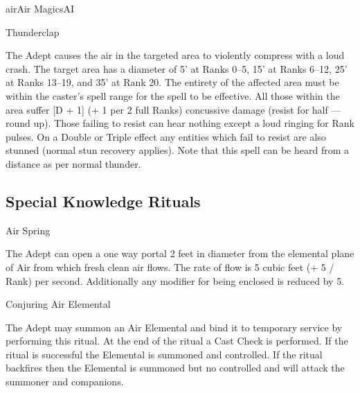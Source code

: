 \begin{college}[2.1]{air}{Air Magics}{AI}
\begin{spell}[S-19]{Thunderclap}
\begin{effects}
The Adept causes the air in the targeted area to violently compress
with a loud crash. The target area has a diameter of 5' at Ranks 0--5,
15' at Ranks 6--12, 25' at Ranks 13--19, and 35' at Rank 20. The
entirety of the affected area must be within the caster's spell range
for the spell to be effective. All those within the area suffer [D +
1] (+ 1 per 2 full Ranks) concussive damage (resist for half --- round
up). Those failing to resist can hear nothing except a loud ringing
for Rank pulses. On a Double or Triple effect any entities which fail
to resist are also stunned (normal stun recovery applies). Note that
this spell can be heard from a distance as per normal thunder.
\end{effects}
\end{spell}


\subsection{Special Knowledge Rituals}

\begin{ritual}[R-1]{Air Spring}

\begin{effects}
The Adept can open a one way portal 2 feet in diameter from the
elemental plane of Air from which fresh clean air flows. The rate of
flow is 5 cubic feet (+ 5 / Rank) per second. Additionally any
modifier for being enclosed is reduced by 5.
\end{effects}
\end{ritual}

\begin{ritual}[R-2]{Conjuring Air Elemental}

\begin{effects}
The Adept may summon an Air Elemental and bind it to temporary service
by performing this ritual.  At the end of the ritual a Cast Check is
performed.  If the ritual is successful the Elemental is summoned and
controlled.  If the ritual backfires then the Elemental is summoned
but no controlled and will attack the summoner and companions.


\end{effects}
\end{ritual}
\end{college}
